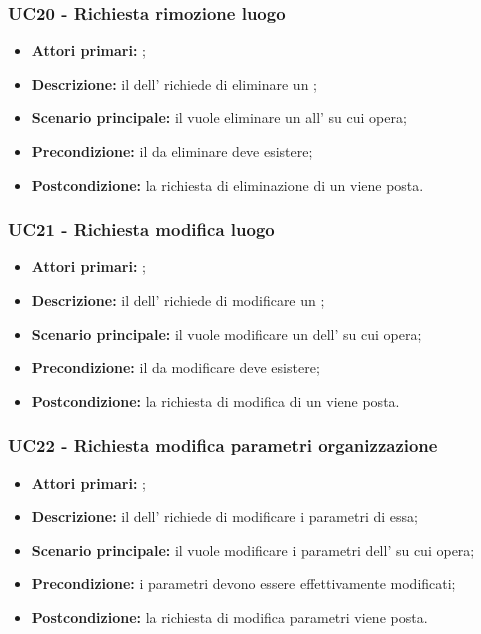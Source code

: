 \documentclass[casi-duso]{subfiles}
\begin{document}
\subsubsection{UC20 - Richiesta rimozione luogo}
\label{subsub:UC20}
\begin{itemize}
  \item \textbf{Attori primari:} ;
  \item \textbf{Descrizione:} il  dell' richiede di eliminare un ;
  \item \textbf{Scenario principale:} il  vuole eliminare un  all' su cui opera;
  \item \textbf{Precondizione:} il  da eliminare deve esistere;
  \item \textbf{Postcondizione:} la richiesta di eliminazione di un  viene posta.
\end{itemize}

\subsubsection{UC21 - Richiesta modifica luogo}
\label{subsub:UC21}
\begin{itemize}
  \item \textbf{Attori primari:} ;
  \item \textbf{Descrizione:} il  dell' richiede di modificare un ;
  \item \textbf{Scenario principale:} il  vuole modificare un  dell' su cui opera;
  \item \textbf{Precondizione:} il  da modificare deve esistere;
  \item \textbf{Postcondizione:} la richiesta di modifica di un  viene posta.
\end{itemize}


\subsubsection{UC22 - Richiesta modifica parametri organizzazione}
\label{subsub:UC22}
\begin{itemize}
  \item \textbf{Attori primari:} ;
  \item \textbf{Descrizione:} il  dell' richiede di modificare i parametri di essa;
  \item \textbf{Scenario principale:} il  vuole modificare i parametri dell' su cui opera;
  \item \textbf{Precondizione:} i parametri devono essere effettivamente modificati;
  \item \textbf{Postcondizione:} la richiesta di modifica parametri viene posta.
\end{itemize}
\end{document}
